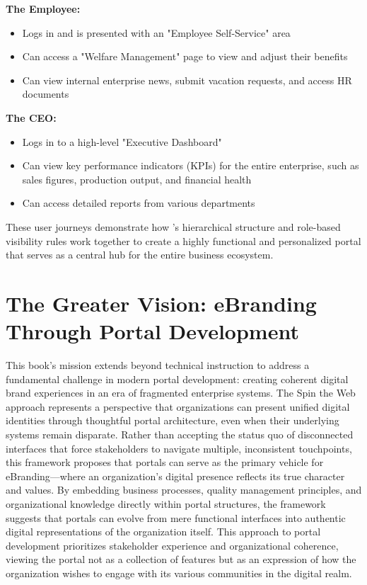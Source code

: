 \textbf{The Employee:}
\begin{itemize}
	\item Logs in and is presented with an "Employee Self-Service" area
	\item Can access a "Welfare Management" page to view and adjust their benefits
	\item Can view internal enterprise news, submit vacation requests, and access HR documents
\end{itemize}

\textbf{The CEO:}
\begin{itemize}
	\item Logs in to a high-level "Executive Dashboard"
	\item Can view key performance indicators (KPIs) for the entire enterprise, such as sales figures, production output, and financial health
	\item Can access detailed reports from various departments
\end{itemize}

These user journeys demonstrate how \wbdl{}'s hierarchical structure and role-based visibility rules work together to create a highly functional and personalized portal that serves as a central hub for the entire business ecosystem.

\section{The Greater Vision: eBranding Through Portal Development}
\label{sec:ebranding-vision}

This book's mission extends beyond technical instruction to address a fundamental challenge in modern portal development: creating coherent digital brand experiences in an era of fragmented enterprise systems. The Spin the Web approach represents a perspective that organizations can present unified digital identities through thoughtful portal architecture, even when their underlying systems remain disparate. Rather than accepting the status quo of disconnected interfaces that force stakeholders to navigate multiple, inconsistent touchpoints, this framework proposes that portals can serve as the primary vehicle for eBranding—where an organization's digital presence reflects its true character and values. By embedding business processes, quality management principles, and organizational knowledge directly within portal structures, the framework suggests that portals can evolve from mere functional interfaces into authentic digital representations of the organization itself. This approach to portal development prioritizes stakeholder experience and organizational coherence, viewing the portal not as a collection of features but as an expression of how the organization wishes to engage with its various communities in the digital realm.

